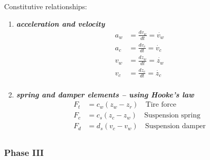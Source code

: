 Constitutive relationships:
\begin{enumerate}
	\item \textbf{\textit{acceleration and velocity}}
	\begin{align}
		a_w &= \frac{d v_w}{dt} = \dot{v_w} \\
		a_c &= \frac{d v_c}{dt} = \dot{v_c} \\
		v_w &= \frac{d z_w}{dt} = \dot{z_w} \\
		v_c &= \frac{d z_c}{dt} = \dot{z_c} \\
	\end{align}
	\item \textbf{\textit{spring and damper elements -- using Hooke's law}}
	\begin{align}
		F_t &= c_w (z_w - z_r) \quad \text{Tire force} \\
		F_c &= c_s (z_c - z_w) \quad \text{Suspension spring} \\
		F_d &= d_s (v_c - v_w) \quad \text{Suspension damper} \\
	\end{align}
\end{enumerate} 

\subsubsection{Phase III}

